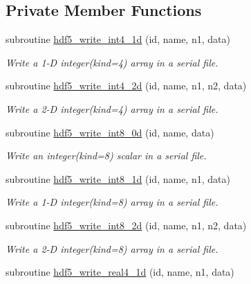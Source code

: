 \subsection*{Private Member Functions}
\begin{DoxyCompactItemize}
\item 
subroutine \hyperlink{interfacemodhdf5_1_1hdf5__write__data_a33e6b35760f15f06a5804cd0caa3da0b}{hdf5\+\_\+write\+\_\+int4\+\_\+1d} (id, name, n1, data)
\begin{DoxyCompactList}\small\item\em Write a 1-\/D integer(kind=4) array in a serial file. \end{DoxyCompactList}\item 
subroutine \hyperlink{interfacemodhdf5_1_1hdf5__write__data_a3c4d3b976cc7ded0445f44f4806119eb}{hdf5\+\_\+write\+\_\+int4\+\_\+2d} (id, name, n1, n2, data)
\begin{DoxyCompactList}\small\item\em Write a 2-\/D integer(kind=4) array in a serial file. \end{DoxyCompactList}\item 
subroutine \hyperlink{interfacemodhdf5_1_1hdf5__write__data_a3d54b82d734756ac3b7e04eefa3f42b3}{hdf5\+\_\+write\+\_\+int8\+\_\+0d} (id, name, data)
\begin{DoxyCompactList}\small\item\em Write an integer(kind=8) scalar in a serial file. \end{DoxyCompactList}\item 
subroutine \hyperlink{interfacemodhdf5_1_1hdf5__write__data_ace548f4140d1a7c171dfa972edaae0ac}{hdf5\+\_\+write\+\_\+int8\+\_\+1d} (id, name, n1, data)
\begin{DoxyCompactList}\small\item\em Write a 1-\/D integer(kind=8) array in a serial file. \end{DoxyCompactList}\item 
subroutine \hyperlink{interfacemodhdf5_1_1hdf5__write__data_aeb5d82f4adffdf6967fde4ab3844674b}{hdf5\+\_\+write\+\_\+int8\+\_\+2d} (id, name, n1, n2, data)
\begin{DoxyCompactList}\small\item\em Write a 2-\/D integer(kind=8) array in a serial file. \end{DoxyCompactList}\item 
subroutine \hyperlink{interfacemodhdf5_1_1hdf5__write__data_a75929560447e383a91b35d46c4ce8914}{hdf5\+\_\+write\+\_\+real4\+\_\+1d} (id, name, n1, data)

\end{DoxyCompactItemize}
